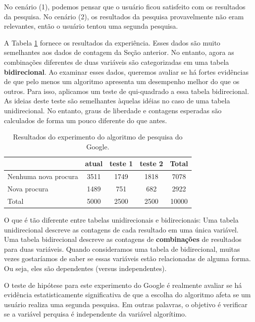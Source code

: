 \documentclass[
]{book}
\theoremstyle{definition}
\theoremstyle{definition}
\theoremstyle{definition}
\theoremstyle{definition}
\theoremstyle{remark}
\begin{document}
No cenário (1), podemos pensar que o usuário ficou satisfeito com os resultados da pesquisa. No cenário (2), os resultados da pesquisa provavelmente não eram relevantes, então o usuário tentou uma segunda pesquisa.

A Tabela \ref{tab:googleSearchAlgorithmByAlgorithmAndPerformanceWithTotals} fornece os resultados da experiência. Esses dados são muito semelhantes aos dados de contagem da Seção anterior. No entanto, agora as combinações diferentes de duas variáveis são categorizadas em uma tabela \textbf{bidirecional}. Ao examinar esses dados, queremos avaliar se há fortes evidências de que pelo menos um algoritmo apresenta um desempenho melhor do que os outros. Para isso, aplicamos um teste de qui-quadrado a essa tabela bidirecional. As ideias deste teste são semelhantes àquelas idéias no caso de uma tabela unidirecional. No entanto, graus de liberdade e contagens esperadas são calculados de forma um pouco diferente do que antes.

\begin{table}

\caption{\label{tab:googleSearchAlgorithmByAlgorithmAndPerformanceWithTotals}Resultados do experimento do algoritmo de pesquisa do Google.}
\centering
\begin{tabular}[t]{l|c|c|c|c}
\hline
  & atual & teste 1 & teste 2 & Total\\
\hline
Nenhuma nova procura & 3511 & 1749 & 1818 & 7078\\
\hline
Nova procura & 1489 & 751 & 682 & 2922\\
\hline
Total & 5000 & 2500 & 2500 & 10000\\
\hline
\end{tabular}
\end{table}

O que é tão diferente entre tabelas unidirecionais e bidirecionais: Uma tabela unidirecional descreve as contagens de cada resultado em uma única variável. Uma tabela bidirecional descreve as contagens de \textbf{combinações} de resultados para duas variáveis. Quando consideramos uma tabela de bidirecional, muitas vezes gostaríamos de saber se essas variáveis estão relacionadas de alguma forma. Ou seja, eles são dependentes (versus independentes).

O teste de hipótese para este experimento do Google é realmente avaliar se há evidência estatisticamente significativa de que a escolha do algoritmo afeta se um usuário realiza uma segunda pesquisa. Em outras palavras, o objetivo é verificar se a variável perquisa é independente da variável algorítimo.
\end{document}
